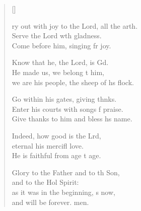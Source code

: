 \settowidth{\versewidth}{Cry out with joy to the Lord, all the earth. +}
\begin{verse}[\versewidth]
  \begin{patverse}
ry out with joy to the Lord, all the arth.\Flex\\
Serve the Lord w\pointup{\i}th gladness.\Med\\
Come before him, singing fr joy.

Know that he, the Lord, is Gd.\Flex\\
He made us, we belong t him,\Med\\
we are his people, the sheep of h\pointup{\i}s flock.

Go within his gates, giving thnks.\Flex\\
Enter his courts with songs f praise.\Med\\
Give thanks to him and bless h\pointup{\i}s name.

Indeed, how good is the Lrd,\Flex\\
eternal his mercifl love.\Med\\
He is faithful from age t age.

Glory to the Father and to th Son,\Med\\
and to the Hol Spirit:\\
as it was in the beginning, \pointup{\i}s now,\Med\\
and will be forever. men.
  \end{patverse}
\end{verse}
